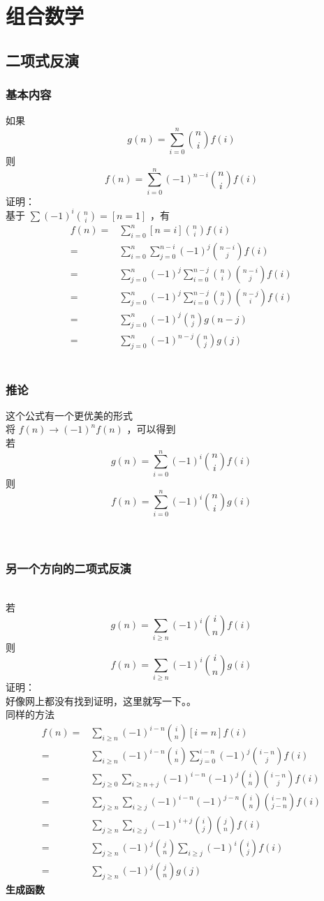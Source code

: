

	\newpage
	\section{组合数学}
	\subsection{二项式反演}	
	\subsubsection{基本内容}
	如果
	$$
	g(n)=\sum_{i=0}^n\binom{n}{i}f(i)
	$$
	则
	$$
	f(n)=\sum_{i=0}^n(-1)^{n-i}\binom nif(i)
	$$
	证明：\\
	基于 $\sum(-1)^i \binom ni=[n=1]$ ，有
	$$
	\begin{aligned}
	f(n)=&\sum_{i=0}^n[n=i]\binom nif(i)
	\\=&\sum_{i=0}^n\sum_{j=0}^{n-i}(-1)^j\binom{n-i}jf(i)
	\\=&\sum_{j=0}^n(-1)^j\sum_{i=0}^{n-j}\binom ni\binom{n-i}jf(i)
	\\=&\sum_{j=0}^n(-1)^j\sum_{i=0}^{n-j}\binom nj \binom {n-j}if(i)
	\\=&\sum_{j=0}^n(-1)^j\binom njg(n-j)
	\\=&\sum_{j=0}^n (-1)^{n-j}\binom njg(j)
	\end{aligned}
	$$\\
	\subsubsection{推论}这个公式有一个更优美的形式\\
	将 $f(n)\rightarrow(-1)^nf(n)$ ，可以得到\\
	若
	$$
	g(n)=\sum_{i=0}^n(-1)^i\binom nif(i)
	$$
	则
	$$
	f(n)=\sum_{i=0}^n(-1)^i\binom nig(i)
	$$\\
	~\\	
	\subsubsection{另一个方向的二项式反演}~\\
	若
	$$
	g(n)=\sum_{i\ge n}(-1)^{i}\binom in f(i)
	$$
	则
	$$
	f(n)=\sum_{i\ge n}(-1)^{i}\binom in g(i)
	$$
	证明：\\
	好像网上都没有找到证明，这里就写一下。。\\
	同样的方法\\
	$$
	\begin{aligned}
	f(n)=&\sum_{i\ge n}(-1)^{i-n}\binom in[i=n]f(i)
	\\=&\sum_{i\ge n}(-1)^{i-n}\binom in\sum_{j=0}^{i-n}(-1)^j\binom{i-n}j f(i)
	\\=&\sum_{j\ge 0}\sum_{i\ge n+j}(-1)^{i-n}(-1)^j\binom in\binom{i-n}jf(i)
	\\=&\sum_{j\ge n}\sum_{i\ge j}(-1)^{i-n}(-1)^{j-n} \binom in\binom{i-n}{j-n}f(i)
	\\=&\sum_{j\ge n}\sum_{i\ge j}(-1)^{i+j}\binom ij \binom jnf(i)
	\\=&\sum_{j\ge n}(-1)^j\binom jn\sum_{i\ge j}(-1)^i\binom ijf(i)
	\\=&\sum_{j\ge n}(-1)^j\binom jng(j)
	\end{aligned}
	$$
	\newpage
	\textbf{\large 生成函数}
